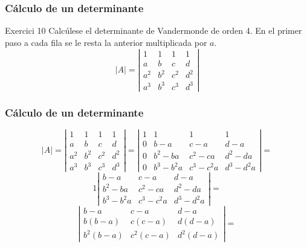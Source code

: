\documentclass[aspectratio=169]{beamer}
\begin{document}
\begin{frame}
  \frametitle{C\'alculo de un determinante}
     \begin{block}{Exercici 10}
Calc\'ulese el determinante de Vandermonde de orden 4. En el primer paso a cada fila se le resta la anterior multiplicada por $a$.
\[|A| = \left|\begin{array}{cccc}1 & 1 & 1 & 1 \\ a & b & c & d \\ a^2 & b^2 & c^2 & d^2 \\a^3 & b^3 & c^3 & d^3 \end{array}\right|\]
\end{block}
\end{frame} 

\begin{frame}
  \frametitle{C\'alculo de un determinante}
\[|A| = \left|\begin{array}{cccc}1 & 1 & 1 & 1 \\ a & b & c & d \\ a^2 & b^2 & c^2 & d^2 \\a^3 & b^3 & c^3 & d^3 \end{array}\right| = \left|\begin{array}{cccc}1 & 1 & 1 & 1 \\ 0 & b-a & c-a & d-a \\ 0 & b^2-ba & c^2-ca & d^2-da \\0 & b^3-b^2a & c^3-c^2a & d^3-d^2a \end{array}\right| = \]
\[1\left|\begin{array}{ccc} b-a & c-a & d-a \\ b^2-ba & c^2-ca & d^2-da \\b^3-b^2a & c^3-c^2a & d^3-d^2a \end{array}\right| = \]
\[\left|\begin{array}{ccc} b-a & c-a & d-a \\ b(b-a) & c(c-a) & d(d-a) \\b^2(b-a) & c^2(c-a) & d^2(d-a) \end{array}\right| =\]

\end{frame} 
\end{document}
